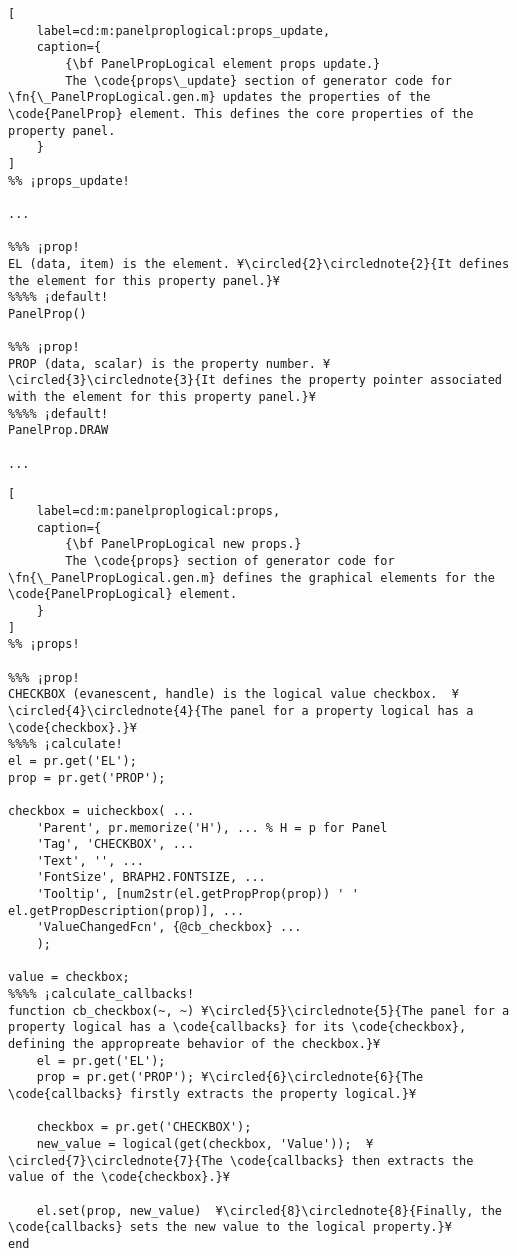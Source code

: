 \documentclass{tufte-handout}
\begin{document}
\begin{lstlisting}[
	label=cd:m:panelproplogical:props_update,
	caption={
		{\bf PanelPropLogical element props update.}
		The \code{props\_update} section of generator code for \fn{\_PanelPropLogical.gen.m} updates the properties of the \code{PanelProp} element. This defines the core properties of the property panel.
	}
]
%% ¡props_update!

...

%%% ¡prop!
EL (data, item) is the element. ¥\circled{2}\circlednote{2}{It defines the element for this property panel.}¥
%%%% ¡default!
PanelProp()

%%% ¡prop!
PROP (data, scalar) is the property number. ¥\circled{3}\circlednote{3}{It defines the property pointer associated with the element for this property panel.}¥
%%%% ¡default!
PanelProp.DRAW

...

\end{lstlisting}

\begin{lstlisting}[
	label=cd:m:panelproplogical:props,
	caption={
		{\bf PanelPropLogical new props.}
		The \code{props} section of generator code for \fn{\_PanelPropLogical.gen.m} defines the graphical elements for the \code{PanelPropLogical} element.
	}
]
%% ¡props!

%%% ¡prop!
CHECKBOX (evanescent, handle) is the logical value checkbox.  ¥\circled{4}\circlednote{4}{The panel for a property logical has a \code{checkbox}.}¥
%%%% ¡calculate!
el = pr.get('EL');
prop = pr.get('PROP');

checkbox = uicheckbox( ...
    'Parent', pr.memorize('H'), ... % H = p for Panel
    'Tag', 'CHECKBOX', ...
    'Text', '', ...
    'FontSize', BRAPH2.FONTSIZE, ...
    'Tooltip', [num2str(el.getPropProp(prop)) ' ' el.getPropDescription(prop)], ...
    'ValueChangedFcn', {@cb_checkbox} ...
    );

value = checkbox;
%%%% ¡calculate_callbacks!
function cb_checkbox(~, ~) ¥\circled{5}\circlednote{5}{The panel for a property logical has a \code{callbacks} for its \code{checkbox}, defining the appropreate behavior of the checkbox.}¥
    el = pr.get('EL');
    prop = pr.get('PROP'); ¥\circled{6}\circlednote{6}{The \code{callbacks} firstly extracts the property logical.}¥
    
    checkbox = pr.get('CHECKBOX');
    new_value = logical(get(checkbox, 'Value'));  ¥\circled{7}\circlednote{7}{The \code{callbacks} then extracts the value of the \code{checkbox}.}¥
    
    el.set(prop, new_value)  ¥\circled{8}\circlednote{8}{Finally, the \code{callbacks} sets the new value to the logical property.}¥
end

\end{lstlisting}
\end{document}
